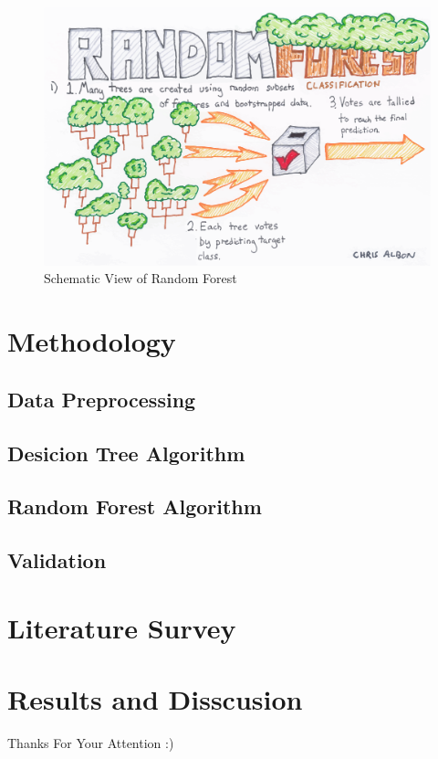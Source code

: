 \documentclass{beamer}
\begin{document}
\begin{frame}
    \begin{figure}
        \includegraphics[scale=0.15]{img/Random_Forest.png}
        \caption{Schematic View of Random Forest}
    \end{figure}
    \end{frame}
\section{Methodology}
\subsection{Data Preprocessing}
\subsection{Desicion Tree Algorithm}
\subsection{Random Forest Algorithm}
\subsection{Validation}
\section{Literature Survey}
\section{Results and Disscusion}


\begin{frame}
\Huge{\centerline{Thanks For Your Attention :)}}
\end{frame}

\end{document}
